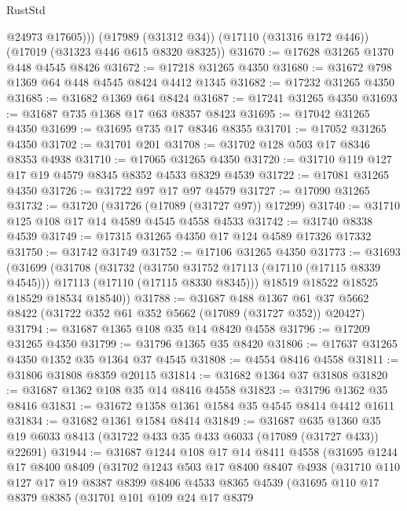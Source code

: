 \begin{lexlean}{RustStd}
\begin{coremodule}
          @24973
          @17605)))
    (@17989 (@31312 @34))
    (@17110 (@31316 @172 @446))
    (@17019 (@31323 @446 @615 @8320 @8325))
@31670 := @17628 @31265 @1370 @448 @4545 @8426
@31672 := @17218 @31265 @4350
@31680 := @31672 @798 @1369 @64 @448 @4545 @8424 @4412 @1345
@31682 := @17232 @31265 @4350
@31685 := @31682 @1369 @64 @8424
@31687 := @17241 @31265 @4350
@31693 := @31687 @735 @1368 @17 @63 @8357 @8423
@31695 := @17042 @31265 @4350
@31699 := @31695 @735 @17 @8346 @8355
@31701 := @17052 @31265 @4350
@31702 := @31701 @201
@31708 := @31702 @128 @503 @17 @8346 @8353 @4938
@31710 := @17065 @31265 @4350
@31720 := @31710 @119 @127 @17 @19 @4579 @8345 @8352 @4533 @8329 @4539
@31722 := @17081 @31265 @4350
@31726 := @31722 @97 @17 @97 @4579
@31727 := @17090 @31265
@31732 := @31720 (@31726 (@17089 (@31727 @97)) @17299)
@31740 := @31710 @125 @108 @17 @14 @4589 @4545 @4558 @4533
@31742 := @31740 @8338 @4539
@31749 := @17315 @31265 @4350 @17 @124 @4589 @17326 @17332
@31750 := @31742 @31749
@31752 := @17106 @31265 @4350
@31773 := @31693
    (@31699
      (@31708
        (@31732
          (@31750 @31752 @17113 (@17110 (@17115 @8339 @4545)))
          @17113
          (@17110 (@17115 @8330 @8345)))
        @18519
        @18522
        @18525
        @18529
        @18534
        @18540))
@31788 := @31687
    @488
    @1367
    @61
    @37
    @5662
    @8422
    (@31722 @352 @61 @352 @5662 (@17089 (@31727 @352)) @20427)
@31794 := @31687 @1365 @108 @35 @14 @8420 @4558
@31796 := @17209 @31265 @4350
@31799 := @31796 @1365 @35 @8420
@31806 := @17637 @31265 @4350 @1352 @35 @1364 @37 @4545
@31808 := @4554 @8416 @4558
@31811 := @31806 @31808 @8359 @20115
@31814 := @31682 @1364 @37 @31808
@31820 := @31687 @1362 @108 @35 @14 @8416 @4558
@31823 := @31796 @1362 @35 @8416
@31831 := @31672 @1358 @1361 @1584 @35 @4545 @8414 @4412 @1611
@31834 := @31682 @1361 @1584 @8414
@31849 := @31687
    @635
    @1360
    @35
    @19
    @6033
    @8413
    (@31722 @433 @35 @433 @6033 (@17089 (@31727 @433)) @22691)
@31944 := @31687
    @1244
    @108
    @17
    @14
    @8411
    @4558
    (@31695
      @1244
      @17
      @8400
      @8409
      (@31702
        @1243
        @503
        @17
        @8400
        @8407
        @4938
        (@31710
          @110
          @127
          @17
          @19
          @8387
          @8399
          @8406
          @4533
          @8365
          @4539
          (@31695
            @110
            @17
            @8379
            @8385
            (@31701
              @101
              @109
              @24
              @17
              @8379

\end{coremodule}
\end{lexlean}

